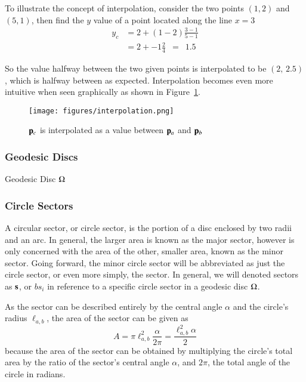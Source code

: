 To illustrate the concept of interpolation, consider the two points $(1, 2)$ and $(5, 1)$, then find the $y$ value of a point located along the line $x = 3$
%
\begin{align}
	y_c & = 2 + (1 - 2) \frac{3 - 1}{5 - 1} \\
	& = 2 + -1 \frac{2}{4} \enspace = \enspace  1.5
	\label{eq:interpolationSpecific}
\end{align}

So the value halfway between the two given points is interpolated to be $(2,\,2.5)$, which is halfway between as expected. Interpolation becomes even more intuitive when seen graphically as shown in Figure~\ref{fig:interpolation}.

\begin{figure}
\ffigbox
	{\texttt{[image: figures/interpolation.png]}}
	{\caption[Interpolation between two points in $\bR{2}$]{$\mathbf{p}_c$ is interpolated as a value between $\mathbf{p}_a$ and $\mathbf{p}_b$}\label{fig:interpolation}}
\end{figure}

%
\subsubsection{Geodesic Discs}
\label{ch2sBssGsssGD}
Geodesic Disc $\Omega$%
%
%

%
\subsubsection{Circle Sectors}
\label{ch2sBssGsssCS}
A circular sector, or circle sector, is the portion of a disc enclosed by two radii and an arc. In general, the larger area is known as the major sector, however  is only concerned with the area of the other, smaller area, known as the minor sector. Going forward, the minor circle sector will be abbreviated as just the circle sector, or even more simply, the sector. In general, we will denoted sectors as $\mathbf{s}$, or $bs_i$ in reference to a specific circle sector in a geodesic disc $\Omega$.%
%
%
%

As the sector can be described entirely by the central angle $\alpha$ and the circle's radius $\ell_{a,b}$, the area of the sector can be given as
%
\begin{equation}
	A = \pi \ell_{a,b}^2\frac{\alpha}{2\pi} = \frac{\ell_{a,b}^2\alpha}{2}
	\label{eq:areaOfCircleSector}
\end{equation}
%
because the area of the sector can be obtained by multiplying the circle's total area by the ratio of the sector's central angle $\alpha$, and $2\pi$, the total angle of the circle in radians.~\cite{Weisstein19d}%
%

